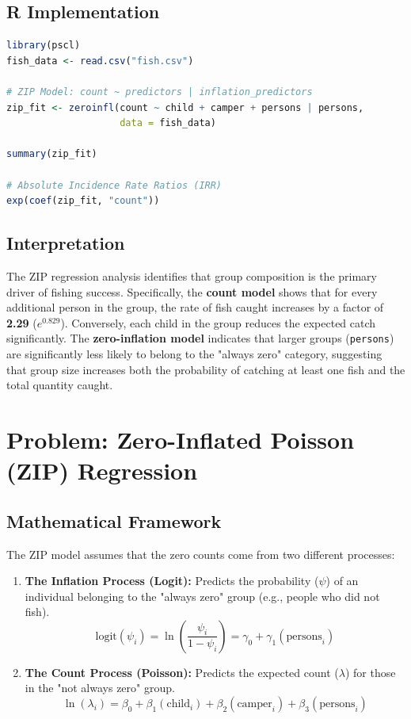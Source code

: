 \documentclass[12pt, a4paper]{article}
\begin{document}
\subsection{R Implementation}
\begin{lstlisting}[language=R, caption=R Zero-Inflated Poisson]
library(pscl)
fish_data <- read.csv("fish.csv")

# ZIP Model: count ~ predictors | inflation_predictors
zip_fit <- zeroinfl(count ~ child + camper + persons | persons, 
                    data = fish_data)

summary(zip_fit)

# Absolute Incidence Rate Ratios (IRR)
exp(coef(zip_fit, "count"))
\end{lstlisting}

\subsection{Interpretation}
The ZIP regression analysis identifies that group composition is the primary driver of fishing success. Specifically, the \textbf{count model} shows that for every additional person in the group, the rate of fish caught increases by a factor of \textbf{2.29} ($e^{0.829}$). Conversely, each child in the group reduces the expected catch significantly. The \textbf{zero-inflation model} indicates that larger groups (\texttt{persons}) are significantly less likely to belong to the "always zero" category, suggesting that group size increases both the probability of catching at least one fish and the total quantity caught.

\section{Problem: Zero-Inflated Poisson (ZIP) Regression}

\subsection{Mathematical Framework}
The ZIP model assumes that the zero counts come from two different processes:
\begin{enumerate}
    \item \textbf{The Inflation Process (Logit):} Predicts the probability ($\psi$) of an individual belonging to the "always zero" group (e.g., people who did not fish).
    \[ \text{logit}(\psi_i) = \ln\left(\frac{\psi_i}{1-\psi_i}\right) = \gamma_0 + \gamma_1 (\text{persons}_i) \]
    \item \textbf{The Count Process (Poisson):} Predicts the expected count ($\lambda$) for those in the "not always zero" group.
    \[ \ln(\lambda_i) = \beta_0 + \beta_1 (\text{child}_i) + \beta_2 (\text{camper}_i) + \beta_3 (\text{persons}_i) \]
\end{enumerate}
\end{document}
